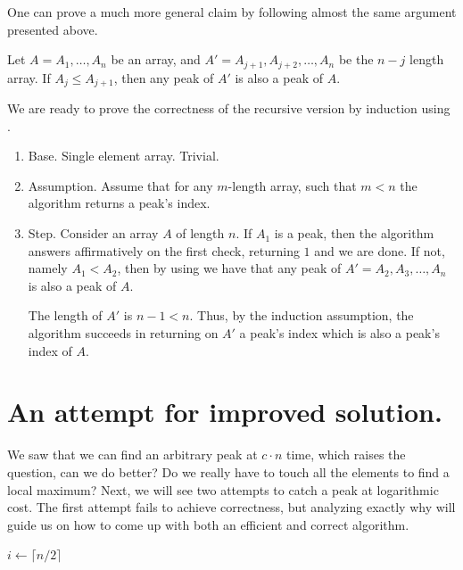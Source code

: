One can prove a much more general claim by following almost the same argument presented above.

 \begin{claim} \label{claim:subarraymiddle} 
   Let $A = A_1, \dots, A_n$ be an array, and $A' = A_{j+1}, A_{j+2}, \dots, A_n$ be the $n-j$ length array. If $A_j \le A_{j+1}$, then any peak of $A'$ is also a peak of $A$.
\end{claim}

We are ready to prove the correctness of the recursive version by induction using . 

\begin{enumerate}
  \item Base. Single element array. Trivial. 
  \item Assumption. Assume that for any $m$-length array, such that $m<n$ the algorithm returns a peak's index. 
  \item Step. Consider an array $A$ of length $n$. If $A_1$ is a peak, then the algorithm answers affirmatively on the first check, returning $1$ and we are done. If not, namely $A_1 < A_2$, then by using  we have that any peak of $A' = A_2, A_3, \dots, A_n$ is also a peak of $A$. 

    The length of $A'$ is $n-1 < n$. Thus, by the induction assumption, the algorithm succeeds in returning on $A'$ a peak's index which is also a peak's index of $A$.
\end{enumerate}

\section{An attempt for improved solution.}
We saw that we can find an arbitrary peak at $c\cdot n$ time, which raises the question, can we do better? Do we really have to touch all the elements to find a local maximum? Next, we will see two attempts to catch a peak at logarithmic cost. The first attempt fails to achieve correctness, but analyzing exactly why will guide us on how to come up with both an efficient and correct algorithm.
\begin{algorithm}
\caption{fail attempt for more improved alg. }
        $ i \leftarrow  \lceil n/2 \rceil $\\
\end{algorithm}

